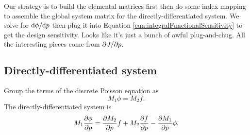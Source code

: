 Our strategy is to build the elemental matrices first then do some index mapping to assemble the global system matrix for the directly-differentiated system.  We solve for $\mathrm{d}{\phi}/\mathrm{d}{p}$ then plug it into Equation \ref{eqn:integralFunctionalSensitivity} to get the design sensitivity.  Looks like it's just a bunch of awful plug-and-chug.  All the interesting pieces come from $\partial{J}/\partial{p}$.

\subsection{Directly-differentiated system}

Group the terms of the discrete Poisson equation as
%
\begin{equation}
M_1 \phi = M_2 f.
\end{equation}
%
The directly-differentiated system is
%
\begin{equation}
M_1 \frac{\partial{\phi}}{\partial{p}} = \frac{\partial{M_2}}{\partial{p}} f + M_2 \frac{\partial{f}}{\partial{p}} - \frac{\partial{M_1}}{\partial{p}} \phi.
\end{equation}









